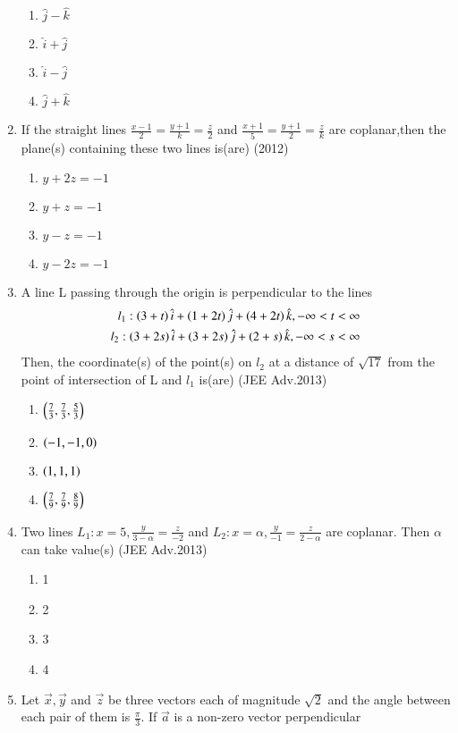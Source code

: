 \documentclass[journal]{IEEEtran}
\numberwithin{equation}{enumi}
\numberwithin{figure}{enumi}
\begin{document}
\begin{enumerate}
\begin{enumerate}
			\item $\hat{j}-\hat{k}$
			\item $\hat{i}+\hat{j}$
			\item $\hat{i}-\hat{j}$
			\item $\hat{j}+\hat{k}$
		\end{enumerate}
	\item If the straight lines $\frac{x-1}{2}=\frac{y+1}{k}=\frac{z}{2}$ and $\frac{x+1}{5}=\frac{y+1}{2}=\frac{z}{k}$ are coplanar,then the plane(s) containing these two lines is(are) \hfill{(2012)}
		\begin{enumerate}
			\item $y+2z=-1$
			\item $y+z=-1$
			\item $y-z=-1$
			\item $y-2z=-1$
		\end{enumerate}
	\item A line L passing through the origin is perpendicular to the lines
		\begin{align*}
			l_1 : \left(3+t\right)\hat{i}+\left(1+2t\right)\hat{j}+\left(4+2t\right)\hat{k}, -\infty<t<\infty \\
			l_2 : \left(3+2s\right)\hat{i}+\left(3+2s\right)\hat{j}+\left(2+s\right)\hat{k},-\infty<s<\infty 
		\end{align*}
		Then, the coordinate(s) of the point(s) on $l_2$ at a distance of $\sqrt{17}$ from the point of intersection of L and $l_1$ is(are) \hfill{(JEE Adv.2013)}
		\begin{enumerate}
			\item $\left(\frac{7}{3},\frac{7}{3},\frac{5}{3}\right)$
			\item $\left(-1,-1,0\right)$
			\item $\left(1,1,1\right)$
			\item $\left(\frac{7}{9},\frac{7}{9},\frac{8}{9}\right)$
		\end{enumerate}
	\item Two lines $L_1: x=5,\frac{y}{3-\alpha}=\frac{z}{-2}$ and $L_2: x=\alpha,\frac{y}{-1}=\frac{z}{2-\alpha}$ are coplanar. Then $\alpha$ can take value(s) \hfill{(JEE Adv.2013)}
		\begin{enumerate}
			\item 1
			\item 2 
			\item 3
			\item 4
		\end{enumerate}
	\item Let $\vec{x},\vec{y}$ and $\vec{z}$ be three vectors each of magnitude $\sqrt{2}$ and the angle between each pair of them is $\frac{\pi}{3}$. If $\vec{a}$ is a non-zero vector perpendicular

\end{enumerate}
\end{document}
